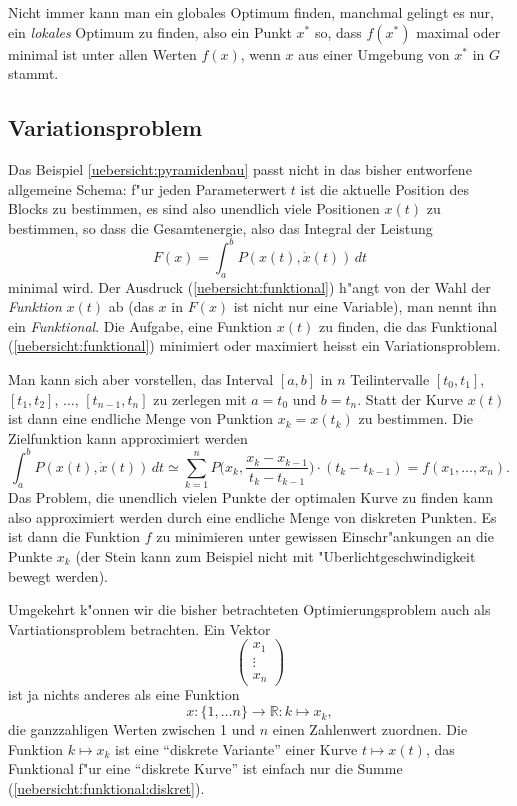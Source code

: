 Nicht immer kann man ein globales Optimum finden, manchmal gelingt es
nur, ein {\it lokales} Optimum zu finden, also ein Punkt $x^*$ so,
dass $f(x^*)$ maximal oder minimal ist unter allen Werten $f(x)$,
wenn $x$ aus einer Umgebung von $x^*$ in $G$ stammt.

\subsection{Variationsproblem}
Das Beispiel \ref{uebersicht:pyramidenbau} passt nicht in das bisher
entworfene allgemeine Schema: f"ur jeden
Parameterwert $t$ ist die aktuelle Position des Blocks zu bestimmen,
es sind also unendlich viele Positionen $x(t)$ zu bestimmen, so 
dass die Gesamtenergie, also das Integral der Leistung
\begin{equation}
F(x)=
\int_{a}^{b}P(x(t),\dot x(t))\,dt
\label{uebersicht:funktional}
\end{equation}
minimal wird.
Der Ausdruck (\ref{uebersicht:funktional}) h"angt von der Wahl der
{\em Funktion} $x(t)$ ab (das $x$ in $F(x)$ ist nicht nur eine
Variable), man nennt ihn ein {\em Funktional}.
Die Aufgabe, eine Funktion $x(t)$ zu finden, die das Funktional
(\ref{uebersicht:funktional}) minimiert oder maximiert heisst
ein Variationsproblem.

Man kann sich aber vorstellen, das Interval
$[a,b]$ in $n$ Teilintervalle
$[t_0,t_1]$, $[t_1,t_2]$, $\dots$, $[t_{n-1},t_n]$ zu
zerlegen mit $a=t_0$ und $b=t_n$. Statt der Kurve
$x(t)$ ist dann eine endliche Menge von Punktion $x_k=x(t_k)$ 
zu bestimmen. Die Zielfunktion kann approximiert werden
\begin{equation}
\int_{a}^{b}P(x(t),\dot x(t))\,dt
\simeq
\sum_{k=1}^n P\biggl(x_k,\frac{x_k-x_{k-1}}{t_k-t_{k-1}}\biggr)\cdot (t_k-t_{k-1})
=f(x_1,\dots,x_n).
\label{uebersicht:funktional:diskret}
\end{equation}
Das Problem, die unendlich vielen Punkte der optimalen Kurve
zu finden kann also approximiert werden durch eine endliche Menge
von diskreten Punkten.
Es ist dann die Funktion $f$ zu minimieren
unter gewissen Einschr"ankungen an die Punkte $x_k$ (der Stein kann
zum Beispiel nicht mit "Uberlichtgeschwindigkeit bewegt werden).


Umgekehrt k"onnen wir die bisher betrachteten Optimierungsproblem auch
als Vartiationsproblem betrachten. Ein Vektor
\[
\begin{pmatrix}
x_1\\\vdots\\ x_n
\end{pmatrix}
\]
ist ja nichts anderes als eine Funktion
\[
x\colon \{1,\dots n\}\to \mathbb R: k\mapsto x_k,
\]
die ganzzahligen Werten zwischen 1 und $n$ einen Zahlenwert
zuordnen.
Die Funktion $k\mapsto x_k$ ist eine ``diskrete Variante'' einer
Kurve $t\mapsto x(t)$, das Funktional f"ur eine ``diskrete Kurve''
ist einfach nur die Summe (\ref{uebersicht:funktional:diskret}).



